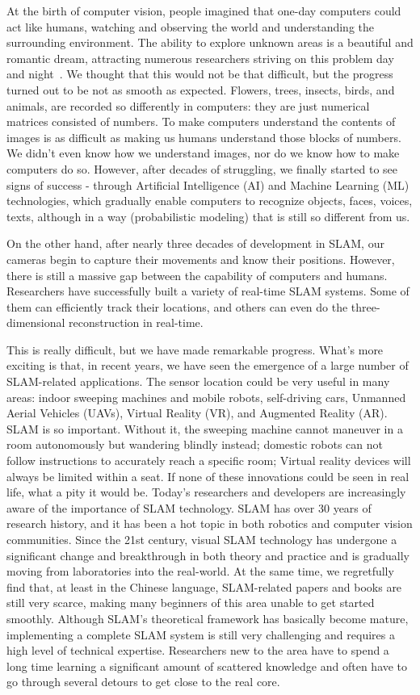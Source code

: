 At the birth of computer vision, people imagined that one-day computers could act like humans, watching and observing the world and understanding the surrounding environment. The ability to explore unknown areas is a beautiful and romantic dream, attracting numerous researchers striving on this problem day and night~\cite{Hartley2003}. We thought that this would not be that difficult, but the progress turned out to be not as smooth as expected. Flowers, trees, insects, birds, and animals, are recorded so differently in computers: they are just numerical matrices consisted of numbers. To make computers understand the contents of images is as difficult as making us humans understand those blocks of numbers. We didn't even know how we understand images, nor do we know how to make computers do so. However, after decades of struggling,  we finally started to see signs of success - through Artificial Intelligence (AI) and Machine Learning (ML) technologies, which gradually enable computers to recognize objects, faces, voices, texts, although in a way (probabilistic modeling) that is still so different from us.

On the other hand, after nearly three decades of development in SLAM, our cameras begin to capture their movements and know their positions. However, there is still a massive gap between the capability of computers and humans. Researchers have successfully built a variety of real-time SLAM systems. Some of them can efficiently track their locations, and others can even do the three-dimensional reconstruction in real-time.

This is really difficult, but we have made remarkable progress. What's more exciting is that, in recent years, we have seen the emergence of a large number of SLAM-related applications. The sensor location could be very useful in many areas: indoor sweeping machines and mobile robots, self-driving cars, Unmanned Aerial Vehicles (UAVs), Virtual Reality (VR), and Augmented Reality (AR). SLAM is so important. Without it, the sweeping machine cannot maneuver in a room autonomously but wandering blindly instead; domestic robots can not follow instructions to accurately reach a specific room; Virtual reality devices will always be limited within a seat. If none of these innovations could be seen in real life, what a pity it would be.
Today's researchers and developers are increasingly aware of the importance of SLAM technology. SLAM has over 30 years of research history, and it has been a hot topic in both robotics and computer vision communities. Since the 21st century, visual SLAM technology has undergone a significant change and breakthrough in both theory and practice and is gradually moving from laboratories into the real-world. At the same time, we regretfully find that, at least in the Chinese language, SLAM-related papers and books are still very scarce, making many beginners of this area unable to get started smoothly. Although SLAM's theoretical framework has basically become mature, implementing a complete SLAM system is still very challenging and requires a high level of technical expertise. Researchers new to the area have to spend a long time learning a significant amount of scattered knowledge and often have to go through several detours to get close to the real core.

